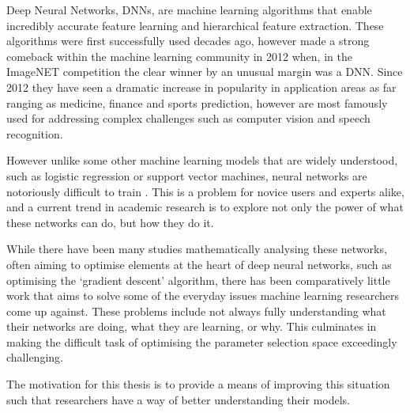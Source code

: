 \documentclass[a4paper,11pt,titlepage]{article}
\begin{document}
	Deep Neural Networks, DNNs, are machine learning algorithms that enable incredibly accurate feature learning and hierarchical feature extraction. These algorithms were first successfully used decades ago, however made a strong comeback within the machine learning community in 2012 when, in the ImageNET competition the clear winner by an unusual margin was a DNN. Since 2012 they have seen a dramatic increase in popularity in application areas as far ranging as medicine, finance and sports prediction, however are most famously used for addressing complex challenges such as computer vision and speech recognition.
\par 
However unlike some other machine learning models that are widely understood, such as logistic regression or support vector machines, neural networks are notoriously difficult to train \cite{Nielsen}. This is a problem for novice users and experts alike, and a current trend in academic research is to explore not only the power of what these networks can do, but how they do it. 
\par
While there have been many studies mathematically analysing these networks, often aiming to optimise elements at the heart of deep neural networks, such as optimising the `gradient descent' algorithm, there has been comparatively little work that aims to solve some of the everyday issues machine learning researchers come up against. These problems include not always fully understanding what their networks are doing, what they are learning, or why. This culminates in making the difficult task of optimising the parameter selection space exceedingly challenging.
\par
The motivation for this thesis is to provide a means of improving this situation such that researchers have a way of better understanding their models.
\end{document}
